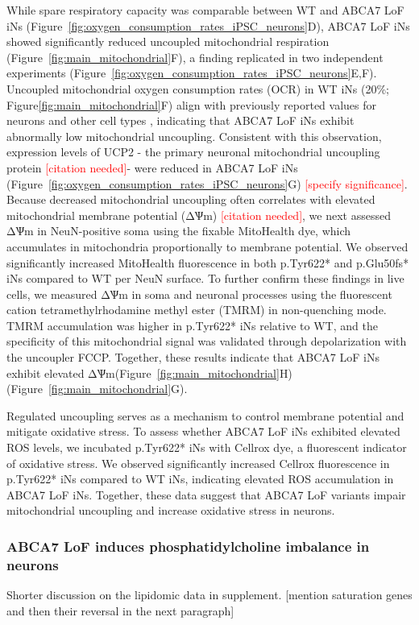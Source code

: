 While spare respiratory capacity was comparable between WT and ABCA7 LoF iNs (Figure~\ref{fig:oxygen_consumption_rates_iPSC_neurons}D), ABCA7 LoF iNs showed significantly reduced uncoupled mitochondrial respiration (Figure~\ref{fig:main_mitochondrial}F), a finding replicated in two independent experiments (Figure~\ref{fig:oxygen_consumption_rates_iPSC_neurons}E,F). Uncoupled mitochondrial oxygen consumption rates (OCR) in WT iNs (20\%; Figure\ref{fig:main_mitochondrial}F) align with previously reported values for neurons and other cell types \cite{Divakaruni2011-uj,Jekabsons2004-fn}, indicating that ABCA7 LoF iNs exhibit abnormally low mitochondrial uncoupling. Consistent with this observation, expression levels of UCP2 - the primary neuronal mitochondrial uncoupling protein \textcolor{red}{[citation needed]}- were reduced in ABCA7 LoF iNs (Figure~\ref{fig:oxygen_consumption_rates_iPSC_neurons}G) \textcolor{red}{[specify significance]}. Because decreased mitochondrial uncoupling often correlates with elevated mitochondrial membrane potential (ΔѰm) \textcolor{red}{[citation needed]}, we next assessed ΔѰm in NeuN-positive soma using the fixable MitoHealth dye, which accumulates in mitochondria proportionally to membrane potential. We observed significantly increased MitoHealth fluorescence in both p.Tyr622* and p.Glu50fs* iNs compared to WT per NeuN surface. To further confirm these findings in live cells, we measured ΔѰm in soma and neuronal processes using the fluorescent cation tetramethylrhodamine methyl ester (TMRM) in non-quenching mode. TMRM accumulation was higher in p.Tyr622* iNs relative to WT, and the specificity of this mitochondrial signal was validated through depolarization with the uncoupler FCCP. Together, these results indicate that ABCA7 LoF iNs exhibit elevated ΔѰm(Figure~\ref{fig:main_mitochondrial}H)(Figure~\ref{fig:main_mitochondrial}G). 

Regulated uncoupling serves as a mechanism to control membrane potential and mitigate oxidative stress. To assess whether ABCA7 LoF iNs exhibited elevated ROS levels, we incubated p.Tyr622* iNs with Cellrox dye, a fluorescent indicator of oxidative stress. We observed significantly increased Cellrox fluorescence in p.Tyr622* iNs compared to WT iNs, indicating elevated ROS accumulation in ABCA7 LoF iNs. Together, these data suggest that ABCA7 LoF variants impair mitochondrial uncoupling and increase oxidative stress in neurons.

\subsubsection{ABCA7 LoF induces phosphatidylcholine imbalance in neurons}
Shorter discussion on the lipidomic data in supplement.
[mention saturation genes and then their reversal in the next paragraph]

